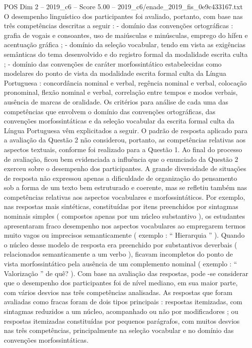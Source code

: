 \begin{textsample}{POS Dim 2 – 2019\_c6 – Score 5.00 – 2019\_c6/enade\_2019\_fis\_0e9c433167.txt}
O desempenho linguístico dos participantes foi avaliado, portanto, com base nas três competências descritas a seguir : - domínio das convenções ortográficas : grafia de vogais e consoantes, uso de maiúsculas e minúsculas, emprego do hífen e acentuação gráfica ; - domínio da seleção vocabular, tendo em vista as exigências semânticas do tema desenvolvido e do registro formal da modalidade escrita culta ; - domínio das convenções de caráter morfossintático estabelecidas como modelares do ponto de vista da modalidade escrita formal culta da Língua Portuguesa : concordância nominal e verbal, regência nominal e verbal, colocação pronominal, flexão nominal e verbal, correlação entre tempos e modos verbais, ausência de marcas de oralidade.
Os critérios para análise de cada uma das competências que envolvem o domínio das convenções ortográficas, das convenções morfossintáticas e da seleção vocabular da escrita formal culta da Língua Portuguesa vêm explicitados a seguir.
O padrão de resposta aplicado para a avaliação da Questão 2 não considerou, portanto, as competências relativas aos aspectos textuais, conforme foi realizado para a Questão 1.
Ao final do processo de avaliação, ficou bem evidenciada a influência que o enunciado da Questão 2 exerceu sobre o desempenho dos participantes.
A grande diversidade de situações de resposta não expressou apenas a dificuldade de organização do pensamento sob a forma de um texto bem estruturado e coerente, mas se refletiu também nas competências relativas aos aspectos vocabulares e morfossintáticos.
Por exemplo, nas respostas mais sintéticas, constituídas por itens preenchidos por sintagmas nominais simples ( compostos apenas por um núcleo substantivo ), os estudantes apresentaram fraco desempenho nos aspectos vocabulares ao empregarem termos muito vagos ou imprecisos semanticamente ( exemplo : “ Hierarquia ” ).
Quando o núcleo desse modelo de resposta era preenchido por substantivos deverbais ( relacionados semanticamente a um verbo ), ficavam incompletos do ponto de vista morfossintático pela ausência de um complemento nominal ( exemplo : “ Valorização ” de quê? ).
Com base na avaliação das respostas, pode -se considerar que o desempenho dos participantes foi de nível mediano, em sua maior parte, com vários desvios nas três competências analisadas.
As respostas que foram avaliadas como fracas foram de dois tipos principais : respostas itemizadas, com sintagmas reduzidos a um núcleo, acompanhado ou não por modificadores ; ou respostas itemizadas constituídas por pequenos parágrafos, com muitos desvios nas três competências, principalmente na seleção vocabular e no domínio das convenções morfossintáticas.

\end{textsample}
